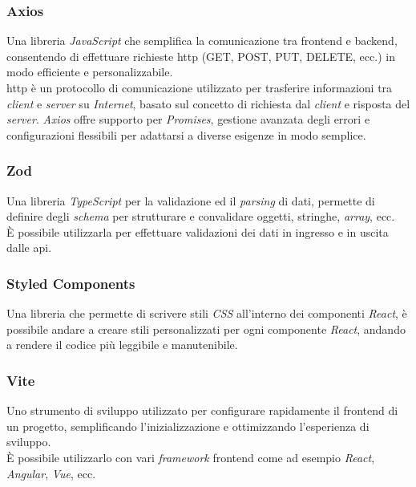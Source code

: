 \subsubsection{Axios}

Una libreria \textit{JavaScript} che semplifica la comunicazione tra \gls{frontend} e \gls{backend}, consentendo di effettuare richieste \gls{http} (GET, POST, PUT, DELETE, ecc.) in modo efficiente e personalizzabile. \\
\gls{http} è un protocollo di comunicazione utilizzato per trasferire informazioni tra \textit{client} e \textit{server} su \textit{Internet}, basato sul concetto di richiesta dal \textit{client} e risposta del \textit{server}.
\textit{Axios} offre supporto per \textit{Promises}, gestione avanzata degli errori e configurazioni flessibili per adattarsi a diverse esigenze in modo semplice.

\subsubsection{Zod}

Una libreria \textit{TypeScript} per la validazione ed il \textit{parsing} di dati, permette di definire degli \textit{schema} per strutturare e convalidare oggetti, stringhe, \textit{array}, ecc. \\
È possibile utilizzarla per effettuare validazioni dei dati in ingresso e in uscita dalle \gls{api}.
\subsubsection{Styled Components}

Una libreria che permette di scrivere stili \textit{CSS} all’interno dei componenti \textit{React}, è possibile andare a creare stili personalizzati per ogni componente \textit{React}, andando a rendere il codice più leggibile e manutenibile.

\subsubsection{Vite}

Uno strumento di sviluppo utilizzato per configurare rapidamente il \gls{frontend} di un progetto, semplificando l'inizializzazione e ottimizzando l'esperienza di sviluppo.\\
È possibile utilizzarlo con vari \textit{framework} \gls{frontend} come ad esempio \textit{React}, \textit{Angular}, \textit{Vue}, ecc.

